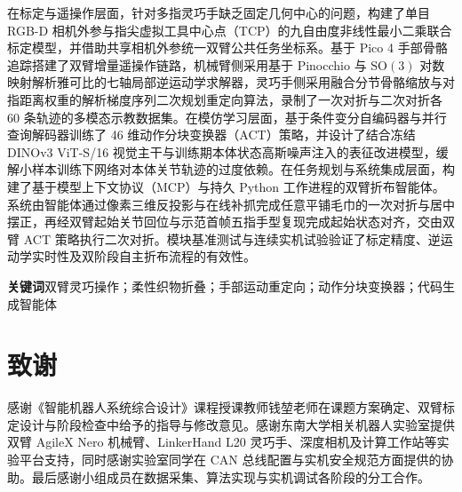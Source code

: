 \documentclass[UTF8,a4paper,12pt,zihao=-4]{ctexart}
\newcommand{\SO}{\mathrm{SO}(3)}
\begin{document}
在标定与遥操作层面，针对多指灵巧手缺乏固定几何中心的问题，构建了单目 RGB-D 相机外参与指尖虚拟工具中心点（TCP）的九自由度非线性最小二乘联合标定模型，并借助共享相机外参统一双臂公共任务坐标系。基于 Pico 4 手部骨骼追踪搭建了双臂增量遥操作链路，机械臂侧采用基于 Pinocchio 与 $\SO$ 对数映射解析雅可比的七轴局部逆运动学求解器，灵巧手侧采用融合分节骨骼缩放与对指距离权重的解析梯度序列二次规划重定向算法，录制了一次对折与二次对折各 60 条轨迹的多模态示教数据集。在模仿学习层面，基于条件变分自编码器与并行查询解码器训练了 46 维动作分块变换器（ACT）策略，并设计了结合冻结 DINOv3 ViT-S/16 视觉主干与训练期本体状态高斯噪声注入的表征改进模型，缓解小样本训练下网络对本体关节轨迹的过度依赖。在任务规划与系统集成层面，构建了基于模型上下文协议（MCP）与持久 Python 工作进程的双臂折布智能体。系统由智能体通过像素三维反投影与在线补抓完成任意平铺毛巾的一次对折与居中摆正，再经双臂起始关节回位与示范首帧五指手型复现完成起始状态对齐，交由双臂 ACT 策略执行二次对折。模块基准测试与连续实机试验验证了标定精度、逆运动学实时性及双阶段自主折布流程的有效性。

\par\vspace{1em}
\noindent\textbf{关键词}\quad 双臂灵巧操作；柔性织物折叠；手部运动重定向；动作分块变换器；代码生成智能体

\newpage
\tableofcontents
\newpage











\newpage
{}
{}



\vspace{1.5em}
\section*{致\quad 谢}

感谢《智能机器人系统综合设计》课程授课教师钱堃老师在课题方案确定、双臂标定设计与阶段检查中给予的指导与修改意见。感谢东南大学相关机器人实验室提供双臂 AgileX Nero 机械臂、LinkerHand L20 灵巧手、深度相机及计算工作站等实验平台支持，同时感谢实验室同学在 CAN 总线配置与实机安全规范方面提供的协助。最后感谢小组成员在数据采集、算法实现与实机调试各阶段的分工合作。

\newpage
\appendix

\end{document}
